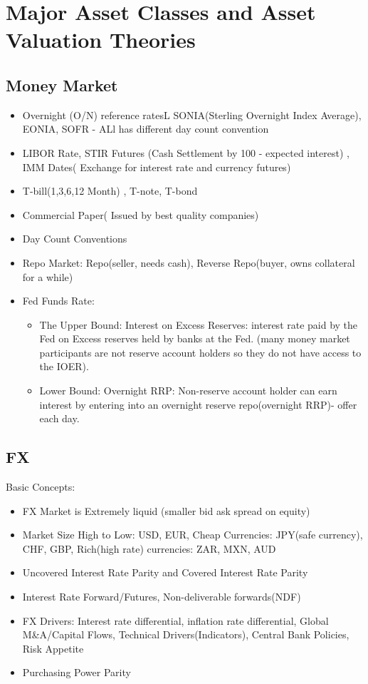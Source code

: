 \documentclass[11pt, openany]{book}              %
\begin{document}
\chapter{Major Asset Classes and Asset Valuation Theories}
\section{Money Market}

\begin{itemize}
    \item Overnight (O/N) reference ratesL SONIA(Sterling Overnight Index Average), EONIA, SOFR - ALl has different day count convention
    \item LIBOR Rate, STIR Futures (Cash Settlement by 100 - expected interest) , IMM Dates( Exchange for interest rate and currency futures)
    \item T-bill(1,3,6,12 Month) , T-note, T-bond
    \item Commercial Paper( Issued by best quality companies)
    \item Day Count Conventions
    \item Repo Market: Repo(seller, needs cash), Reverse Repo(buyer, owns collateral for a while)
    \item Fed Funds Rate: 
    \begin{itemize}
    	\item The Upper Bound: Interest on Excess Reserves: interest rate paid by the Fed on Excess reserves held by banks at the Fed. (many money market participants are not reserve account holders so they do not have access to the IOER). 
    	\item Lower Bound: Overnight RRP: Non-reserve account holder can earn interest by entering into an overnight reserve repo(overnight RRP)- offer each day.
    \end{itemize}
\end{itemize}

\section{FX}

Basic Concepts:
\begin{itemize}
    \item FX Market is Extremely liquid (smaller bid ask spread on equity) 
    \item Market Size High to Low: USD, EUR, Cheap Currencies: JPY(safe currency), CHF, GBP, Rich(high rate) currencies: ZAR, MXN, AUD 
    \item Uncovered Interest Rate Parity and Covered Interest Rate Parity
    \item Interest Rate Forward/Futures, Non-deliverable forwards(NDF)
    \item FX Drivers: Interest rate differential, inflation rate differential, Global M\&A/Capital Flows, Technical Drivers(Indicators), Central Bank Policies, Risk Appetite
    \item Purchasing Power Parity
\end{itemize}
\end{document}
